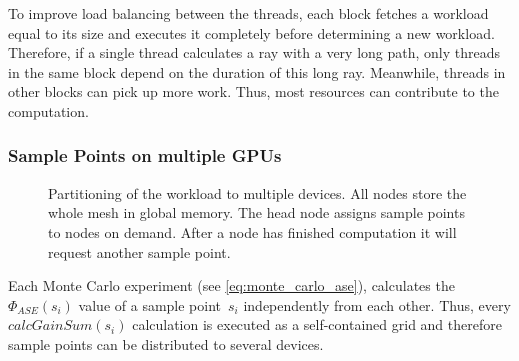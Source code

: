 To improve load balancing between the threads, each block fetches a
workload equal to its size and executes it completely before
determining a new workload. Therefore, if a single thread calculates a
ray with a very long path, only threads in the same block depend on
the duration of this long ray.  Meanwhile, threads in other blocks can
pick up more work. Thus, most resources can contribute to the
computation.
    
\subsubsection{Sample Points on multiple GPUs}
\label{subsubsec:multigpu}
\begin{figure}[H]
  \centerline
      {}
  \caption{Partitioning of the workload to multiple devices. All nodes
    store the whole mesh in global memory. The head node assigns
    sample points to nodes on demand. After a node has finished
    computation it will request another sample point.}
  \label{graphic:multigpu}
\end{figure}
Each Monte Carlo experiment (see \cref{eq:monte_carlo_ase}),
calculates the $\Phi_{ASE}(s_i)$ value of a sample point~$s_i$
independently from each other. Thus, every $calcGainSum(s_i)$
calculation is executed as a self-contained grid and therefore sample
points can be distributed to several devices.

